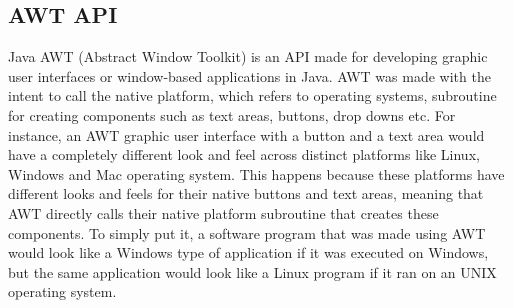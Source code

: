 \documentclass[12pt,a4paper]{report}
\begin{document}
\subsection{AWT API}
Java AWT (Abstract Window Toolkit) is an API made for developing graphic user interfaces or window-based applications in Java. AWT was made with the intent to call the native platform, which refers to operating systems, subroutine for creating components such as text areas, buttons, drop downs etc. For instance, an AWT graphic user interface with a button and a text area would have a completely different look and feel across distinct platforms like Linux, Windows and Mac operating system. This happens because these platforms have different looks and feels for their native buttons and text areas, meaning that AWT directly calls their native platform subroutine that creates these components. To simply put it, a software program that was made using AWT would look like a Windows type of application if it was executed on Windows, but the same application would look like a Linux program if it ran on an UNIX operating system.
\end{document}
